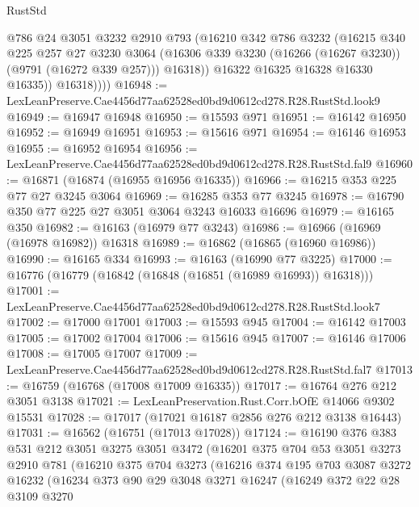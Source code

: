 \begin{lexlean}{RustStd}
\begin{coremodule}
                @786
                @24
                @3051
                @3232
                @2910
                @793
                (@16210
                  @342
                  @786
                  @3232
                  (@16215
                    @340
                    @225
                    @257
                    @27
                    @3230
                    @3064
                    (@16306 @339 @3230 (@16266 (@16267 @3230)) (@9791 (@16272 @339 @257)))
                    @16318))
                @16322
                @16325
                @16328
                @16330
                @16335))
            @16318))))
@16948 := LexLeanPreserve.Cae4456d77aa62528ed0bd9d0612cd278.R28.RustStd.look9
@16949 := @16947 @16948
@16950 := @15593 @971
@16951 := @16142 @16950
@16952 := @16949 @16951
@16953 := @15616 @971
@16954 := @16146 @16953
@16955 := @16952 @16954
@16956 := LexLeanPreserve.Cae4456d77aa62528ed0bd9d0612cd278.R28.RustStd.fal9
@16960 := @16871 (@16874 (@16955 @16956 @16335))
@16966 := @16215 @353 @225 @77 @27 @3245 @3064
@16969 := @16285 @353 @77 @3245
@16978 := @16790 @350 @77 @225 @27 @3051 @3064 @3243 @16033 @16696
@16979 := @16165 @350
@16982 := @16163 (@16979 @77 @3243)
@16986 := @16966 (@16969 (@16978 @16982)) @16318
@16989 := @16862 (@16865 (@16960 @16986))
@16990 := @16165 @334
@16993 := @16163 (@16990 @77 @3225)
@17000 := @16776 (@16779 (@16842 (@16848 (@16851 (@16989 @16993)) @16318)))
@17001 := LexLeanPreserve.Cae4456d77aa62528ed0bd9d0612cd278.R28.RustStd.look7
@17002 := @17000 @17001
@17003 := @15593 @945
@17004 := @16142 @17003
@17005 := @17002 @17004
@17006 := @15616 @945
@17007 := @16146 @17006
@17008 := @17005 @17007
@17009 := LexLeanPreserve.Cae4456d77aa62528ed0bd9d0612cd278.R28.RustStd.fal7
@17013 := @16759 (@16768 (@17008 @17009 @16335))
@17017 := @16764 @276 @212 @3051 @3138
@17021 := LexLeanPreservation.Rust.Corr.bOfE @14066 @9302 @15531
@17028 := @17017 (@17021 @16187 @2856 @276 @212 @3138 @16443)
@17031 := @16562 (@16751 (@17013 @17028))
@17124 := @16190
    @376
    @383
    @531
    @212
    @3051
    @3275
    @3051
    @3472
    (@16201
      @375
      @704
      @53
      @3051
      @3273
      @2910
      @781
      (@16210
        @375
        @704
        @3273
        (@16216
          @374
          @195
          @703
          @3087
          @3272
          @16232
          (@16234
            @373
            @90
            @29
            @3048
            @3271
            @16247
            (@16249
              @372
              @22
              @28
              @3109
              @3270

\end{coremodule}
\end{lexlean}
